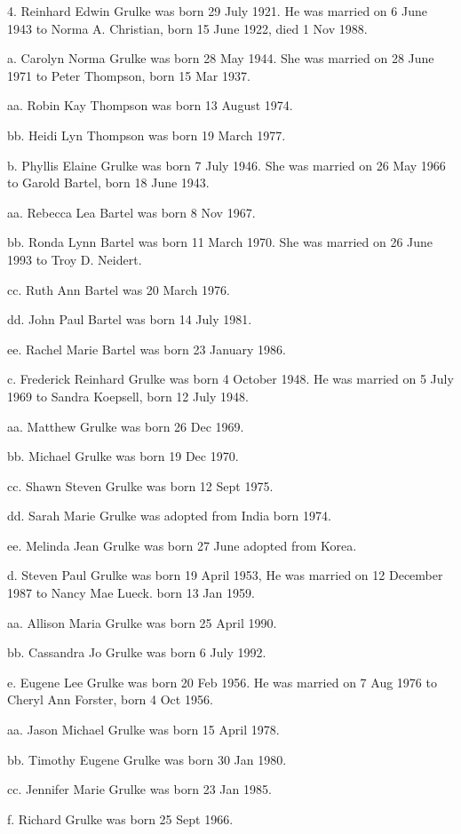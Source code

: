 \documentclass[a4paper]{article}
\begin{document}
4. Reinhard Edwin Grulke was born 29 July 1921.  He was married on 6 June 1943 to Norma A. Christian, born 15 June 1922, died 1 Nov 1988.

a. Carolyn Norma Grulke was born 28 May 1944.  She was married on 28 June 1971 to Peter Thompson, born 15 Mar 1937.

aa. Robin Kay Thompson was born 13 August 1974.

bb. Heidi Lyn Thompson was born 19 March 1977.

b. Phyllis Elaine Grulke was born 7 July 1946.  She was married on 26 May 1966 to Garold Bartel, born 18 June 1943.

aa. Rebecca Lea Bartel was born 8 Nov 1967.

bb. Ronda Lynn Bartel was born 11 March 1970.  She was married on 26 June 1993 to Troy D. Neidert.

cc. Ruth Ann Bartel was  20 March 1976.

dd. John Paul Bartel was born 14 July 1981.

ee. Rachel Marie Bartel was born 23 January 1986.

c. Frederick Reinhard Grulke was born 4 October 1948.  He was married on 5 July 1969 to Sandra Koepsell, born 12 July 1948.

aa. Matthew Grulke was born 26 Dec 1969.

bb. Michael Grulke was born 19 Dec 1970.

cc. Shawn Steven Grulke was born 12 Sept 1975.

dd. Sarah Marie Grulke was adopted from India born 1974.

ee. Melinda Jean Grulke was born 27 June adopted from Korea.

d. Steven Paul Grulke was born 19 April 1953, He was married on 12 December 1987 to Nancy Mae Lueck. born 13 Jan 1959. 

aa. Allison Maria Grulke was born 25 April 1990.

bb. Cassandra Jo Grulke was born 6 July 1992.

e. Eugene Lee Grulke was born 20 Feb 1956.  He was married on 7 Aug 1976 to Cheryl Ann Forster, born 4 Oct 1956.

aa. Jason Michael Grulke was born 15 April 1978.

bb. Timothy Eugene Grulke was born 30 Jan 1980.

cc. Jennifer Marie Grulke was born 23 Jan 1985.

f. Richard Grulke was born 25 Sept 1966.
\end{document}
